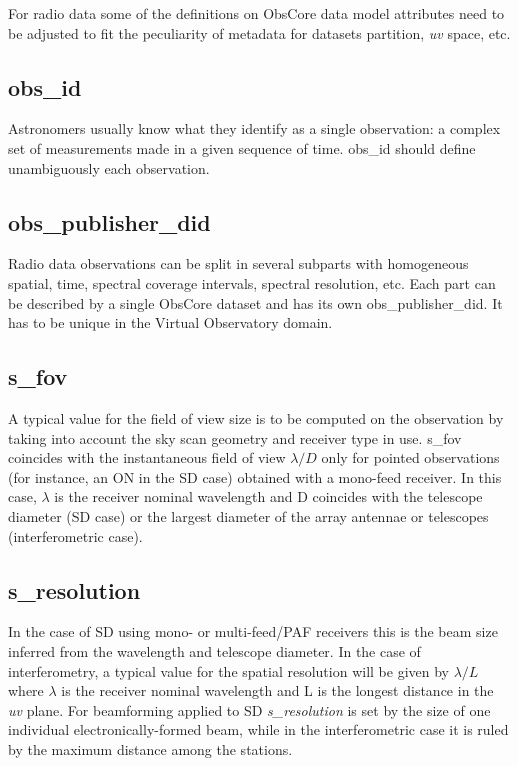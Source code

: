 \documentclass[11pt,a4paper]{ivoa}
\begin{document}
For radio data some of the definitions on ObsCore data model attributes need to be adjusted 
to fit the peculiarity of metadata for datasets partition, \emph{uv} space, etc.

\subsection{obs\_id}

Astronomers usually know what they identify as a single observation: a complex set of 
measurements made in a given sequence of time. obs\_id should define unambiguously each 
observation.

\subsection{obs\_publisher\_did}

Radio data observations can be split in several subparts with homogeneous spatial, 
time, spectral coverage intervals, spectral resolution, etc. Each part can be described by 
a single ObsCore dataset and has its own obs\_publisher\_did. It has to be unique in the 
Virtual Observatory domain.

\subsection{s\_fov}
\label{sec:fov}

A typical value for the field of view size is to be computed on the observation by taking into account the sky scan geometry and receiver type in use.
s\_fov coincides with the instantaneous field of view $\lambda / D$ only for pointed observations (for instance, an ON in the SD case) obtained with a mono-feed receiver. In this case, $\lambda$ is the
receiver nominal wavelength and D coincides with the telescope diameter (SD case) or the largest diameter of the array antennae or telescopes (interferometric case). 



\subsection{s\_resolution}
\label{sec:res}
In the case of SD using mono- or multi-feed/PAF receivers this is the beam size inferred from the wavelength and telescope diameter. 
In the case of interferometry, a typical value for the spatial resolution will be given by $\lambda / L$ where $\lambda$ 
is the %
receiver nominal wavelength and L is the longest distance in the \emph{uv} plane.
For beamforming applied to SD \emph{s\_resolution} is set by the size of one individual electronically-formed beam, while in the interferometric case it is ruled by the maximum distance among the stations.
 
\end{document}
